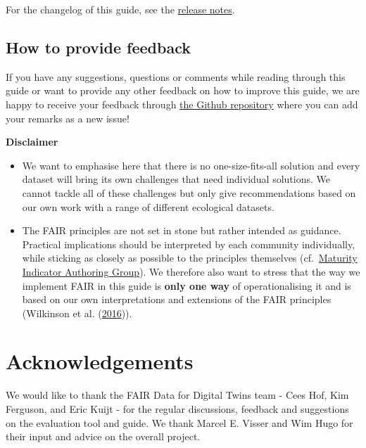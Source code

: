 \documentclass[
]{book}
\begin{document}
For the changelog of this guide, see the \href{https://github.com/LTER-LIFE/FDFDT-Manual?tab=readme-ov-file\#release-notes}{release notes}.

\hypertarget{how-to-provide-feedback}{%
\subsection*{How to provide feedback}\label{how-to-provide-feedback}}

If you have any suggestions, questions or comments while reading through this guide or want to provide any other feedback on how to improve this guide, we are happy to receive your feedback through \href{https://github.com/LTER-LIFE/FDFDT/issues/new}{the Github repository} where you can add your remarks as a new issue!

{\textbf{Disclaimer}}

\begin{itemize}
\item
  We want to emphasise here that there is no one-size-fits-all solution and every dataset will bring its own challenges that need individual solutions. We cannot tackle all of these challenges but only give recommendations based on our own work with a range of different ecological datasets.
\item
  The FAIR principles are not set in stone but rather intended as guidance. Practical implications should be interpreted by each community individually, while sticking as closely as possible to the principles themselves (cf.~\href{https://fairsharing.github.io/FAIR-Evaluator-FrontEnd/\#!/}{Maturity Indicator Authoring Group}). We therefore also want to stress that the way we implement FAIR in this guide is \textbf{only one way} of operationalising it and is based on our own interpretations and extensions of the FAIR principles (Wilkinson et al. (\protect\hyperlink{ref-Wilkinson_2016}{2016})).
\end{itemize}

\hypertarget{acknowledgements}{%
\section*{Acknowledgements}\label{acknowledgements}}

We would like to thank the FAIR Data for Digital Twins team - Cees Hof, Kim Ferguson, and Eric Kuijt - for the regular discussions, feedback and suggestions on the evaluation tool and guide. We thank Marcel E. Visser and Wim Hugo for their input and advice on the overall project.
\end{document}
